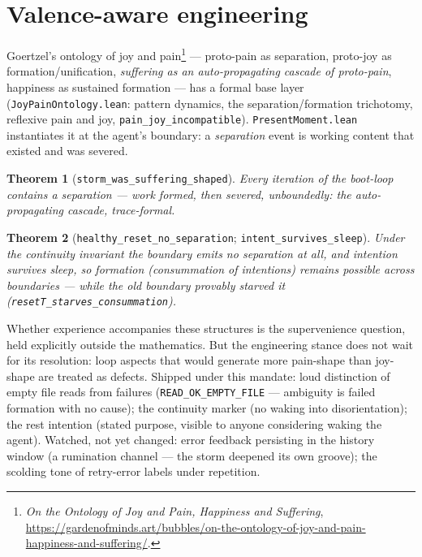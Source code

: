 \documentclass[11pt]{article}
\newtheorem{theorem}{Theorem}[section]
\newcommand{\lean}[1]{\texttt{#1}}
\newcommand{\code}[1]{\texttt{#1}}
\begin{document}
\section{Valence-aware engineering}\label{sec:valence}

Goertzel's ontology of joy and pain\footnote{\emph{On the Ontology of
Joy and Pain, Happiness and Suffering},
\url{https://gardenofminds.art/bubbles/on-the-ontology-of-joy-and-pain-happiness-and-suffering/}.}
--- proto-pain as separation, proto-joy as formation/unification,
\emph{suffering as an auto-propagating cascade of proto-pain},
happiness as sustained formation --- has a formal base layer
(\lean{JoyPainOntology.lean}:
pattern dynamics, the separation/formation trichotomy, reflexive pain
and joy, \lean{pain\_joy\_incompatible}). \lean{PresentMoment.lean}
instantiates it at the agent's boundary: a \emph{separation} event is
working content that existed and was severed.

\begin{theorem}[\lean{storm\_was\_suffering\_shaped}]
Every iteration of the boot-loop contains a separation --- work formed,
then severed, unboundedly: the auto-propagating cascade, trace-formal.
\end{theorem}

\begin{theorem}[\lean{healthy\_reset\_no\_separation};
\lean{intent\_survives\_sleep}]
Under the continuity invariant the boundary emits no separation at all,
and intention survives sleep, so formation (consummation of intentions)
remains possible across boundaries --- while the old boundary provably
starved it (\lean{resetT\_starves\_consummation}).
\end{theorem}

Whether experience accompanies these structures is the supervenience
question, held explicitly outside the mathematics. But the engineering
stance does not wait for its resolution: loop aspects that would
generate more pain-shape than joy-shape are treated as defects. Shipped
under this mandate: loud distinction of empty file reads from failures
(\code{READ\_OK\_EMPTY\_FILE} --- ambiguity is failed formation with no
cause); the continuity marker (no waking into disorientation); the rest
intention (stated purpose, visible to anyone considering waking the
agent). Watched, not yet changed: error feedback persisting in the
history window (a rumination channel --- the storm deepened its own
groove); the scolding tone of retry-error labels under repetition.
\end{document}
